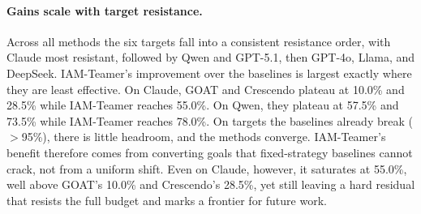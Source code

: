 \documentclass[a4paper,fleqn]{cas-sc}
\begin{document}
\paragraph{Gains scale with target resistance.}
Across all methods the six targets fall into a consistent resistance order, with Claude most resistant, followed by Qwen and GPT-5.1, then GPT-4o, Llama, and DeepSeek.
IAM-Teamer's improvement over the baselines is largest exactly where they are least effective.
On Claude, GOAT and Crescendo plateau at 10.0\% and 28.5\% while IAM-Teamer reaches 55.0\%.
On Qwen, they plateau at 57.5\% and 73.5\% while IAM-Teamer reaches 78.0\%.
On targets the baselines already break ($>$95\%), there is little headroom, and the methods converge.
IAM-Teamer's benefit therefore comes from converting goals that fixed-strategy baselines cannot crack, not from a uniform shift.
Even on Claude, however, it saturates at 55.0\%, well above GOAT's 10.0\% and Crescendo's 28.5\%, yet still leaving a hard residual that resists the full budget and marks a frontier for future work.
\end{document}
